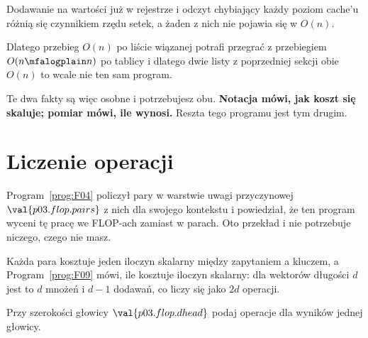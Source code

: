 \begin{fr}

Dodawanie na wartości już w rejestrze i odczyt chybiający każdy poziom cache'u
różnią się czynnikiem rzędu setek, a żaden z nich nie pojawia się w $O(n)$.

Dlatego przebieg $O(n)$ po liście wiązanej potrafi przegrać z przebiegiem
$O(n \mfalogplain n)$ po tablicy i dlatego dwie listy z poprzedniej sekcji
\dash{} obie $O(n)$ \dash{} to wcale nie ten sam program.

\medskip
\noindent
Te dwa fakty są więc osobne i potrzebujesz obu. \textbf{Notacja mówi, jak
koszt się skaluje; pomiar mówi, ile wynosi.} Reszta tego programu jest tym
drugim.
\end{fr}

\section{Liczenie operacji}
\label{sec:P03-flops}

\begin{fr}
Program~\ref{prog:F04} policzył pary w warstwie uwagi przyczynowej \dash{}
$\val{p03.flop.pairs}$ z nich dla swojego kontekstu \dash{} i powiedział, że
ten program wyceni tę pracę we FLOP-ach zamiast w parach. Oto przekład i nie
potrzebuje niczego, czego nie masz.

Każda para kosztuje jeden iloczyn skalarny między zapytaniem a kluczem, a
Program~\ref{prog:F09} mówi, ile kosztuje iloczyn skalarny: dla wektorów
długości $d$ jest to $d$ mnożeń i $d - 1$ dodawań, co liczy się jako $2d$
operacji.

Przy szerokości głowicy $\val{p03.flop.dhead}$ podaj operacje dla wyników
jednej głowicy.
\nextframe
\end{fr}

